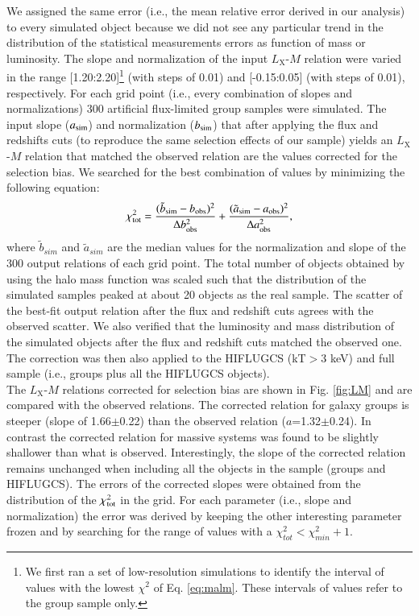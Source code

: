\documentclass{aa} %
\begin{document}
We assigned the same error (i.e., the mean relative error derived in our
analysis) to every simulated object because we did not see any particular trend in the distribution of the statistical measurements errors as function of mass or luminosity. The slope and normalization of the
input $L_{\text{X}}$-$M$ relation were varied in the range [1.20:2.20]\footnote{
  We first ran a set of low-resolution simulations to identify the
  interval of values with the lowest $\chi^2$ of Eq. \ref{eq:malm}. These intervals of values refer to the group sample only.}
(with steps of 0.01) and [-0.15:0.05] (with steps of 0.01),
respectively. For each grid point (i.e., every combination of slopes and
normalizations) 300 artificial flux-limited group samples were simulated. The input slope ($a_{{\rm sim}}$) and
normalization ($b_{{\rm sim}}$) that after applying the flux and redshifts cuts (to
reproduce the same selection effects of our sample) yields an
$L_{\text{X}}$-$M$ relation that matched the observed relation are the
values corrected for the selection bias.
We searched for the best combination of values by minimizing the following equation:\\
\begin{equation}\label{eq:malm}
\chi^2_{{\rm tot}}= \frac{(\tilde{b}_{{\rm sim}}-b_{{\rm obs}})^2}{\Delta b_{{\rm obs}}^2}+\frac{(\tilde{a}_{{\rm sim}}-a_{{\rm obs}})^2}{\Delta a_{{\rm obs}}^2},
\end{equation}
where $\tilde{b}_{sim}$ and $\tilde{a}_{sim}$ are the median values for the normalization and slope of the 300 output relations of each grid point.
The total number of objects obtained by using the halo mass function was scaled such that the distribution of the simulated samples peaked at about 20 objects as the real sample. The scatter of the best-fit output relation after the flux and redshift cuts agrees with the observed scatter. We also verified that the luminosity and mass distribution of the simulated objects after the flux and redshift cuts matched the
observed one. The correction was then also applied to the HIFLUGCS (kT$>$3 keV) and full sample (i.e., groups plus all the HIFLUGCS objects). \\
The $L_{\text{X}}$-$M$ relations corrected for selection bias  are shown in
Fig. \ref{fig:LM} and are compared with the observed relations.  The corrected
relation for galaxy groups is steeper (slope of 1.66$\pm$0.22) than the observed relation
($a$=1.32$\pm$0.24). In contrast the corrected relation for massive systems was found to be slightly shallower than what is observed. Interestingly, the slope of the corrected relation remains unchanged when including all the objects in the sample (groups and HIFLUGCS). The errors of the corrected slopes were obtained from the distribution of the $\chi^2_{{\rm tot}}$ in the grid. For each parameter (i.e., slope and normalization) the error was derived by keeping the other interesting parameter frozen and by searching for the range of values with a $\chi^2_{tot}<\chi^2_{min}+1$.
\end{document}
